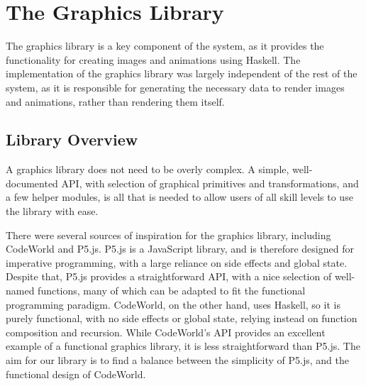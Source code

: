 \documentclass[../main.tex]{subfiles}
\begin{document}
\chapter{The Graphics Library} \label{ch:graphics}
    The graphics library is a key component of the system, as it provides the
        functionality for creating images and animations using Haskell.
    The implementation of the graphics library was largely independent of the rest
        of the system, as it is responsible for generating the necessary data to render
        images and animations, rather than rendering them itself.

    \section{Library Overview}
        A graphics library does not need to be overly complex.
        A simple, well-documented API, with selection of graphical primitives and
            transformations, and a few helper modules, is all that is needed to allow users
            of all skill levels to use the library with ease.

        There were several sources of inspiration for the graphics library, including
            CodeWorld and P5.js.
        P5.js is a JavaScript library, and is therefore designed for imperative
            programming, with a large reliance on side effects and global state.
        Despite that, P5.js provides a straightforward API, with a nice selection of
            well-named functions, many of which can be adapted to fit the functional
            programming paradigm.
        CodeWorld, on the other hand, uses Haskell, so it is purely functional, with no
            side effects or global state, relying instead on function composition and
            recursion.
        While CodeWorld's API provides an excellent example of a functional graphics
            library, it is less straightforward than P5.js.
        The aim for our library is to find a balance between the simplicity of P5.js,
            and the functional design of CodeWorld.
\end{document}
